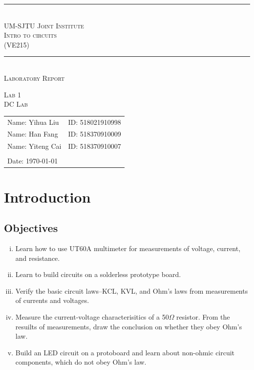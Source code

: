 \documentclass[a4paper]{report}
\begin{document}
	\renewcommand\thesection{\arabic{section}}
	\begin{Large}
		\begin{center}
			\setlength{\baselineskip}{14pt}
			\vspace{1.25cm}
			\rule[0cm]{11.2cm}{0.03em}\\
			\vspace{0.5cm}
			\textsc{UM-SJTU Joint Institute}\\
			\vspace{0.25cm}
			\textsc{Intro to circuits\\(VE215)}
			\vspace{0.3cm}
			\rule[0cm]{11.8cm}{0.05em}
			\vspace{4.9cm}\\
			\textsc{Laboratory Report}
		\end{center}
	\end{Large}
	\vspace{0.85cm}
	\begin{large}
		\begin{center}
			\textsc{Lab 1}
			\vspace{1em}\\
			\textsc{DC Lab}
		\end{center}
		\vspace{6cm}
	\end{large}
	\begin{tabular}{l l}
	Name: Yihua Liu&ID: 518021910998\\
	Name: Han Fang&ID: 518370910009\\
	Name: Yiteng Cai&ID: 518370910007\\
	&\\
	Date: \today&\\
	\end{tabular}
	\thispagestyle{empty}
	\newpage
	\section{Introduction}
	\subsection{Objectives}
	\begin{enumerate}[i.]
		\item Learn how to use UT60A multimeter for measurements of voltage, current, and resistance.
		\item Learn to build circuits on a solderless prototype board.
		\item Verify the basic circuit laws--KCL, KVL, and Ohm's laws from measurements of currents and voltages.
		\item Measure the current-voltage characterisitics of a 50$\Omega$ resistor. From the resuilts of measurements, draw the conclusion on whether they obey Ohm's law.
		\item Build an LED circuit on a protoboard and learn about non-ohmic circuit components, which do not obey Ohm's law.
	\end{enumerate}
\end{document}

